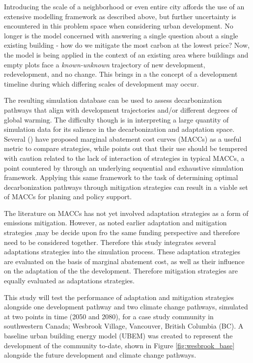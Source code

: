 \documentclass[twocolumn, a4paper,10pt]{article}
\begin{document}
Introducing the scale of a neighborhood or even entire city affords the use of an extensive modelling framework as described above, but further uncertainty is encountered in this problem space when considering urban development. No longer is the model concerned with answering a single question about a single existing building - how do we mitigate the most carbon at the lowest price? Now, the model is being applied in the context of an existing area where buildings and empty plots face a \textit{known-unknown} trajectory of new development, redevelopment, and no change. This brings in a the concept of a development timeline during which differing scales of development may occur.

The resulting simulation database can be used to assess decarbonization pathways that align with development trajectories and/or different degrees of global warming. The difficulty though is in interpreting a large quantity of simulation data for its salience in the decarbonization and adaptation space. Several (\citep{various MACC papers}) have proposed marginal abatement cost curves (MACCs) as a useful metric to compare strategies, while \citet{kesicki} points out that their use should be tempered with caution related to the lack of interaction of strategies in typical MACCs, a point countered by \citet{rysanek MACC} through an underlying sequential and exhaustive simulation framework. Applying this same framework to the task of determining optimal decarbonization pathways through mitigation strategies can result in a viable set of MACCs for planing and policy support.

The literature on MACCs has not yet involved adaptation strategies as a form of emissions mitigation. However, as noted earlier adaptation and mitigation strategies ,may be decide upon fro the same funding perspective and therefore need to be considered together. Therefore this study integrates several adaptations strategies into the simulation process. These adaptation strategies are evaluated on the basis of marginal abatement cost, as well as their influence on the adaptation of the the development. Therefore mitigation strategies are equally evaluated as adaptations strategies. 

This study will test the performance of adaptation and mitigation strategies alongside one development pathway and two climate change pathways, simulated at two points in time (2050 and 2080), for a case study community in southwestern Canada; Wesbrook Village, Vancouver, British Columbia (BC). A baseline urban building energy model (UBEM) was created to represent the development of the community to-date, shown in Figure \ref{fig:wesbrook_base} alongside the future development and climate change pathways.
\end{document}
